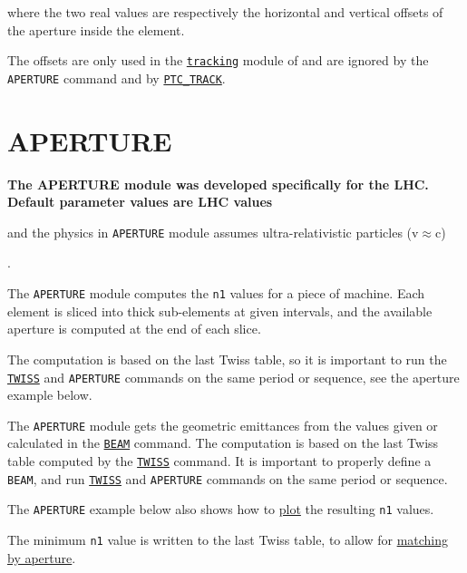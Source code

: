 where the two real values are respectively the horizontal and vertical
offsets of the aperture inside the element. 

The offsets are only used in the \hyperref[chap:thintrack]{\tt tracking} 
module of \madx and are ignored by the {\tt APERTURE} command and by 
\hyperref[sec:ptc_track]{\tt PTC\_TRACK}.


\section{APERTURE}
\label{sec:aperture}
{\bf The APERTURE module was developed specifically for the LHC.\\ 
Default parameter values are LHC values\begin{5.02.04} and the physics 
in {\tt APERTURE} module assumes ultra-relativistic particles (v\(\approx\)c)\end{5.02.04}.} 

The {\tt APERTURE} module computes the {\tt n1} values for a piece of machine. 
Each element is sliced into thick sub-elements at given intervals, and
the available aperture is computed at the end of each slice. 
\begin{5.02.04}
The computation is based on the last Twiss table, so it is important to
run the \hyperref[chap:twiss]{\tt TWISS} and \texttt{APERTURE} commands
on the same period or sequence, see the aperture example below. 
\end{5.02.04}
\begin{5.02.05}
The {\tt APERTURE} module gets the geometric emittances from the values given 
or calculated in the \hyperref[chap:beam]{\tt BEAM} command. 
The computation is based on the last Twiss table computed by the 
\hyperref[chap:twiss]{\tt TWISS} command. 
It is important to properly define a {\tt BEAM}, and run 
\hyperref[chap:twiss]{\tt TWISS} and \texttt{APERTURE} commands 
on the same period or sequence.
\end{5.02.05}

The {\tt APERTURE} example below also shows how to \hyperref[chap:plot]{plot} 
the resulting {\tt n1} values.

The minimum {\tt n1} value is written to the last Twiss table, to
allow for \hyperref[chap:match]{matching by aperture}.   

\begin{5.02.04}
\end{5.02.04}

